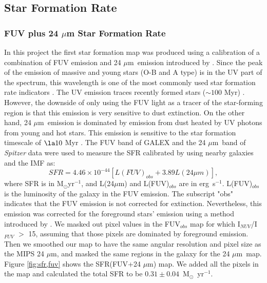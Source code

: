 \documentclass[useAMS,usenatbib]{mn2e}
\newcommand \um    {$\mu$m\ }
\newcommand \Spitzer {{\it Spitzer }}
\newcommand \Galex {GALEX }
\begin{document}
\subsection{Star Formation Rate}
\label{sec:sfr}
\subsubsection{FUV plus 24 $\mu$m Star Formation Rate}

In this project the first star formation map was produced using a calibration of a combination of FUV emission and 24 \um emission introduced by \cite{Hao11}. Since the peak of the emission of massive and young stars (O-B and A type) is in the UV part of the spectrum, this wavelength is one of the most commonly used star formation rate indicators \citep[e.g.][]{Kennicutt89}. The UV emission traces recently formed stars ($\sim 100$ Myr) \citep[e.g.][]{Kennicutt98a, Calzetti05}. However, the downside of only using the FUV light as a tracer of the star-forming region is that this emission is very sensitive to dust extinction. On the other hand, 24 \um emission is dominated by emission from dust heated by UV photons from young and hot stars. This emission is sensitive to the star formation timescale of $\la10$ Myr \citep{Calzetti07}. The FUV band of \Galex and the 24 \um band of \Spitzer data were used to measure the SFR calibrated by \cite{Hao11} using nearby galaxies and the \cite{Kroupa01} IMF as:
\begin{equation}
\label{equ: fuvplus24}
SFR =4.46\times10^{-44}[L(FUV)_{obs}+3.89L(24\mu m)],
\end{equation}
\noindent where SFR is in M$_{\odot}$yr$^{-1}$, and L(24$\mu$m) and L(FUV)$_{obs}$ are in erg~s$^{-1}$. L(FUV)$_{obs}$ is the luminosity of the galaxy in the FUV emission. The subscript "obs" indicates that the FUV emission is not corrected for extinction. Nevertheless, this emission was corrected for the foreground stars' emission using a method introduced by \cite{Leroy08}. We masked out pixel values in the FUV$_{obs}$ map for which I$_{NUV}$/I$_{FUV}$ $>$ 15, assuming that those pixels are dominated by foreground emission. Then we smoothed our map to have the same angular resolution and pixel size as the MIPS 24 $\mu$m, and masked the same regions in the galaxy for the 24 \um map. Figure \ref{fig:sfr,fuv} shows the SFR(FUV+24 $\mu$m) map. We added all the pixels in the map and calculated the total SFR to be $0.31\pm 0.04$~M$_{\odot}$~yr$^{-1}$.
\end{document}

